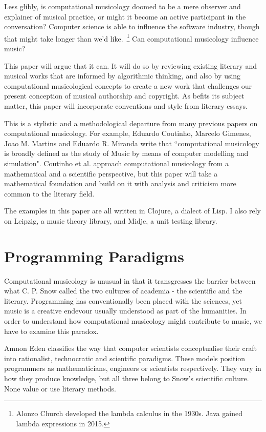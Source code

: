 \documentclass[numbers]{sigplanconf}
\begin{document}
Less glibly, is computational musicology doomed to be a mere observer and explainer of musical practice, or might it become an
active participant in the conversation? Computer science is able to influence the software industry, though that might take longer
than we'd like.~\footnote{Alonzo Church developed the lambda calculus in the 1930s. Java gained lambda expressions in 2015.}
Can computational musicology influence music?

This paper will argue that it can. It will do so by reviewing existing literary and musical works that are informed by algorithmic
thinking, and also by using computational musicological concepts to create a new work that challenges our present conception of
musical authorship and copyright. As befits its subject matter, this paper will incorporate conventions and style from literary
essays.

This is a stylistic and a methodological departure from many previous papers on computational musicology. For example, Eduardo
Coutinho, Marcelo Gimenes, Joao M. Martins and Eduardo R. Miranda write that ``computational musicology is broadly defined as the
study of Music by means of computer modelling and simulation"\cite{Computational Musicology}. Coutinho et al. approach
computational musicology from a mathematical and a scientific perspective, but this paper will take a mathematical foundation
and build on it with analysis and criticism more common to the literary field.

The examples in this paper are all written in Clojure\cite{Clojure}, a dialect of Lisp. I also rely on Leipzig\cite{Leipzig},
a music theory library, and Midje\cite{Midje}, a unit testing library.

\section{Programming Paradigms}

Computational musicology is unusual in that it transgresses the barrier between what C. P. Snow called the two cultures of academia
- the scientific and the literary\cite{Two Cultures}. Programming has conventionally been placed with the sciences, yet music is a
creative endevour usually understood as part of the humanities. In order to understand how computational musicology might
contribute to music, we have to examine this paradox.

Amnon Eden classifies the way that computer scientists conceptualise their craft into rationalist, technocratic and scientific paradigms\cite{Three Paradigms}.
These models position programmers as mathematicians, engineers or scientists respectively. They vary in how they
produce knowledge, but all three belong to Snow's scientific culture. None value or use literary methods.
\end{document}
